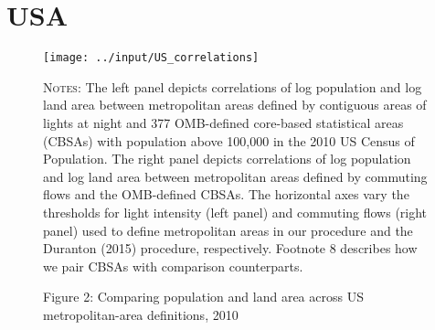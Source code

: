 \documentclass[11pt]{article}
\begin{document}
\section{USA}

\begin{figure}
\caption*{Figure 2: Comparing population and land area across US metropolitan-area definitions, 2010}

\centering{}\texttt{[image: ../input/US\_correlations]}
\begin{minipage}{0.8\textwidth}
{\footnotesize
	\textsc{Notes}:
	The left panel depicts correlations of log population and log land area between metropolitan areas defined by contiguous areas of lights at night
	and 377 OMB-defined core-based statistical areas (CBSAs) with population above 100,000 in the 2010 US Census of Population.
	The right panel depicts correlations of log population and log land area between metropolitan areas defined by commuting flows
	and the OMB-defined CBSAs.
	The horizontal axes vary the thresholds for light intensity (left panel) and commuting flows (right panel) used to define metropolitan areas in our procedure and the Duranton (2015) procedure, respectively.
	Footnote 8 describes how we pair CBSAs with comparison counterparts.\par
}
\end{minipage}
\end{figure}
\end{document}
